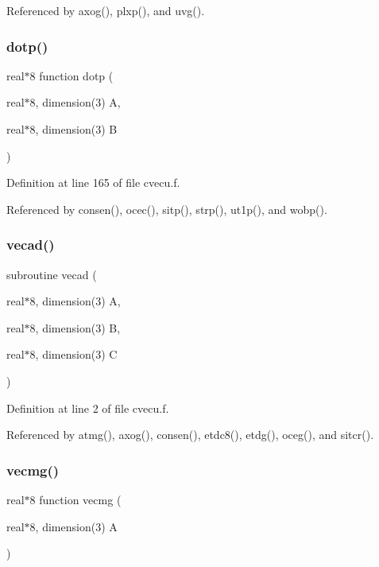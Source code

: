 Referenced by axog(), plxp(), and uvg().

\mbox{\label{cvecu_8f_ad6a81c2e4afb6da85999b1e5bbcc42ce}} 
\subsubsection{\texorpdfstring{dotp()}{dotp()}}
{\footnotesize\ttfamily real$\ast$8 function dotp (\begin{DoxyParamCaption}\item[{real$\ast$8, dimension(3)}]{A,  }\item[{real$\ast$8, dimension(3)}]{B }\end{DoxyParamCaption})}



Definition at line 165 of file cvecu.\+f.



Referenced by consen(), ocec(), sitp(), strp(), ut1p(), and wobp().

\mbox{\label{cvecu_8f_af996c47f35e2c9be1c2fd2debd8dbd4c}} 
\subsubsection{\texorpdfstring{vecad()}{vecad()}}
{\footnotesize\ttfamily subroutine vecad (\begin{DoxyParamCaption}\item[{real$\ast$8, dimension(3)}]{A,  }\item[{real$\ast$8, dimension(3)}]{B,  }\item[{real$\ast$8, dimension(3)}]{C }\end{DoxyParamCaption})}



Definition at line 2 of file cvecu.\+f.



Referenced by atmg(), axog(), consen(), etdc8(), etdg(), oceg(), and sitcr().

\mbox{\label{cvecu_8f_a0d1fc3ffaf70a09d072d55c2e452429d}} 
\subsubsection{\texorpdfstring{vecmg()}{vecmg()}}
{\footnotesize\ttfamily real$\ast$8 function vecmg (\begin{DoxyParamCaption}\item[{real$\ast$8, dimension(3)}]{A }\end{DoxyParamCaption})}



